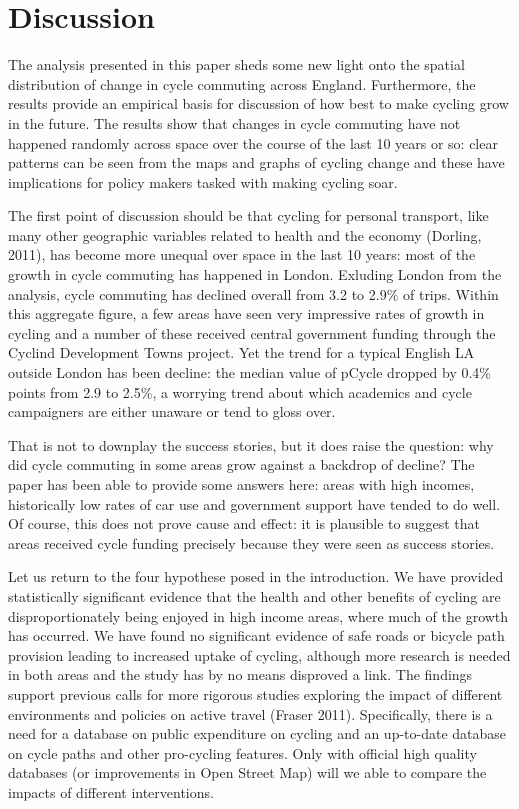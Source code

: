 \section{Discussion}\label{discussion}

The analysis presented in this paper sheds some new light onto the
spatial distribution of change in cycle commuting across England.
Furthermore, the results provide an empirical basis for discussion of
how best to make cycling grow in the future. The results show that
changes in cycle commuting have not happened randomly across space over
the course of the last 10 years or so: clear patterns can be seen from
the maps and graphs of cycling change and these have implications for
policy makers tasked with making cycling soar.

The first point of discussion should be that cycling for personal
transport, like many other geographic variables related to health and
the economy (Dorling, 2011), has become more unequal over space in the
last 10 years: most of the growth in cycle commuting has happened in
London. Exluding London from the analysis, cycle commuting has declined
overall from 3.2 to 2.9\% of trips. Within this aggregate figure, a few
areas have seen very impressive rates of growth in cycling and a number
of these received central government funding through the Cyclind
Development Towns project. Yet the trend for a typical English LA
outside London has been decline: the median value of pCycle dropped by
0.4\% points from 2.9 to 2.5\%, a worrying trend about which academics
and cycle campaigners are either unaware or tend to gloss over.

That is not to downplay the success stories, but it does raise the
question: why did cycle commuting in some areas grow against a backdrop
of decline? The paper has been able to provide some answers here: areas
with high incomes, historically low rates of car use and government
support have tended to do well. Of course, this does not prove cause and
effect: it is plausible to suggest that areas received cycle funding
precisely because they were seen as success stories.

Let us return to the four hypothese posed in the introduction. We have
provided statistically significant evidence that the health and other
benefits of cycling are disproportionately being enjoyed in high income
areas, where much of the growth has occurred. We have found no
significant evidence of safe roads or bicycle path provision leading to
increased uptake of cycling, although more research is needed in both
areas and the study has by no means disproved a link. The findings
support previous calls for more rigorous studies exploring the impact of
different environments and policies on active travel (Fraser 2011).
Specifically, there is a need for a database on public expenditure on
cycling and an up-to-date database on cycle paths and other pro-cycling
features. Only with official high quality databases (or improvements in
Open Street Map) will we able to compare the impacts of different
interventions.

